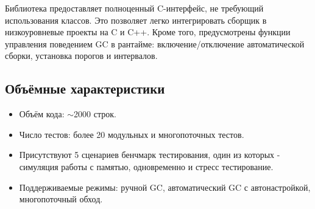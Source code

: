 Библиотека предоставляет полноценный C-интерфейс, не требующий использования классов. Это позволяет легко интегрировать сборщик в низкоуровневые проекты на C и C++. Кроме того, предусмотрены функции управления поведением GC в рантайме: включение/отключение автоматической сборки, установка порогов и интервалов.

\subsection{Объёмные характеристики}

\begin{itemize}
    \item Объём кода: $\sim$2000 строк.
    \item Число тестов: более 20 модульных и многопоточных тестов.
    \item Присутствуют 5 сценариев бенчмарк тестирования, один из которых - симуляция работы с памятью, одновременно и стресс тестирование.
    \item Поддерживаемые режимы: ручной GC, автоматический GC с автонастройкой, многопоточный обход.
\end{itemize}
